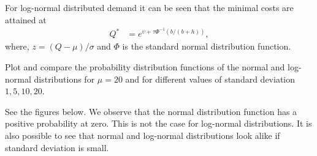 For log-normal distributed demand it can be seen that the minimal costs are attained at
\begin{align*}
Q^* & =e^{\upsilon + \tau \Phi^{-1}(b/(b+h))},
\end{align*}
where, $z=(Q-\mu)/\sigma$ and $\Phi$ is the standard normal distribution function.


\begin{exercise}
Plot and compare the probability distribution functions of the normal and log-normal distributions for $\mu=20$ and  for different values of standard deviation $1, 5, 10, 20$.
\begin{solution}
See the figures below. We observe that the normal distribution function has a positive probability at zero. This is not the case for log-normal distributions. It is also possible to see that normal and log-normal distributions look alike if standard deviation is small.


\end{solution}
\end{exercise}
